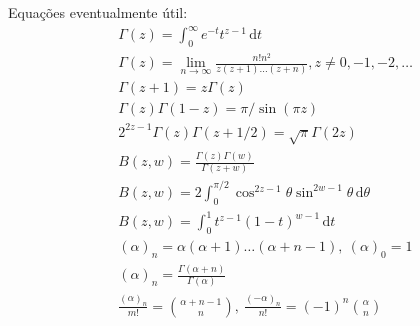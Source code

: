 \documentclass[a4paper,12pt, leqno, answers]{exam}
\begin{document}
\thispagestyle{empty}

\newpage
\setcounter{page}{1}

Equa\c{c}\~{o}es eventualmente útil:
\begin{align}
    & \Gamma(z) = \int_0^\infty e^{-t} t^{z - 1} \,\mathrm{d}t \tag{GE} \label{eq:gamma_euler} \\
    & \Gamma(z) = \lim_{n \to \infty} \frac{n! n^2}{z (z + 1) \ldots (z + n)}, z \neq 0, -1, -2, \ldots \label{eq:gamma_gauss} \\
    & \Gamma(z + 1) = z \Gamma(z) \label{eq:gamma_rel} \\
    & \Gamma(z) \Gamma(1 - z) = \pi / \sin(\pi z) \label{eq:gamma_sin} \\
    & 2^{2 z - 1} \Gamma(z) \Gamma(z + 1/2) = \sqrt{\pi} \Gamma(2 z) \label{eq:gamma_dup_legendre} \\
    & B(z, w) = \frac{\Gamma(z) \Gamma(w)}{\Gamma(z + w)} \tag{BG} \label{eq:beta} \\
    & B(z, w) = 2 \int_0^{\pi / 2} \cos^{2z - 1} \theta \sin^{2w - 1} \theta \,\mathrm{d}\theta \tag{BT} \label{eq:beta_trig} \\
    & B(z, w) = \int_0^1 t^{z - 1} (1 - t)^{w - 1} \,\mathrm{d}t \tag{BI} \label{eq:beta_int} \\
    & (\alpha)_n = \alpha (\alpha + 1) \ldots (\alpha + n - 1), \ (\alpha)_0 = 1 \tag{SP} \label{eq:sim_poch} \\
    & (\alpha)_n = \frac{\Gamma(\alpha + n)}{\Gamma(\alpha)} \label{eq:sim_poch_gamma} \\
    & \frac{(\alpha)_n}{m!} = \binom{\alpha + n - 1}{n}, \ \frac{(-\alpha)_n}{n!} = (-1)^n \binom{\alpha}{n} \label{eq:sim_poch_binom} %
\end{align}
\end{document}
